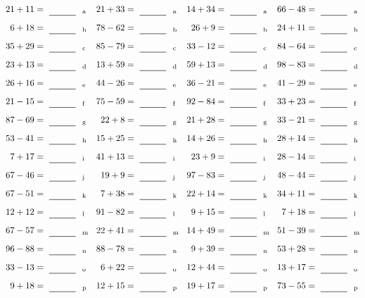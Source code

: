 \documentclass
[
  draft    = true,
  fontsize = 11pt,
  parskip  = half-
]
{scrartcl}
\begin{document}
\clearpage
\begin{align*}
    \pline{21+11}&=\rline{a}
  & \pline{21+33}&=\rline{a}
  & \pline{14+34}&=\rline{a}
  & \pline{66-48}&=\rline{a} \\[1ex]
    \pline{6+18}&=\rline{b}
  & \pline{78-62}&=\rline{b}
  & \pline{26+9}&=\rline{b}
  & \pline{24+11}&=\rline{b} \\[1ex]
    \pline{35+29}&=\rline{c}
  & \pline{85-79}&=\rline{c}
  & \pline{33-12}&=\rline{c}
  & \pline{84-64}&=\rline{c} \\[1ex]
    \pline{23+13}&=\rline{d}
  & \pline{13+59}&=\rline{d}
  & \pline{59+13}&=\rline{d}
  & \pline{98-83}&=\rline{d} \\[1ex]
    \pline{26+16}&=\rline{e}
  & \pline{44-26}&=\rline{e}
  & \pline{36-21}&=\rline{e}
  & \pline{41-29}&=\rline{e} \\[1ex]
    \pline{21-15}&=\rline{f}
  & \pline{75-59}&=\rline{f}
  & \pline{92-84}&=\rline{f}
  & \pline{33+23}&=\rline{f} \\[1ex]
    \pline{87-69}&=\rline{g}
  & \pline{22+8}&=\rline{g}
  & \pline{21+28}&=\rline{g}
  & \pline{33-21}&=\rline{g} \\[1ex]
    \pline{53-41}&=\rline{h}
  & \pline{15+25}&=\rline{h}
  & \pline{14+26}&=\rline{h}
  & \pline{28+14}&=\rline{h} \\[1ex]
    \pline{7+17}&=\rline{i}
  & \pline{41+13}&=\rline{i}
  & \pline{23+9}&=\rline{i}
  & \pline{28-14}&=\rline{i} \\[1ex]
    \pline{67-46}&=\rline{j}
  & \pline{19+9}&=\rline{j}
  & \pline{97-83}&=\rline{j}
  & \pline{48-44}&=\rline{j} \\[1ex]
    \pline{67-51}&=\rline{k}
  & \pline{7+38}&=\rline{k}
  & \pline{22+14}&=\rline{k}
  & \pline{34+11}&=\rline{k} \\[1ex]
    \pline{12+12}&=\rline{l}
  & \pline{91-82}&=\rline{l}
  & \pline{9+15}&=\rline{l}
  & \pline{7+18}&=\rline{l} \\[1ex]
    \pline{67-57}&=\rline{m}
  & \pline{22+41}&=\rline{m}
  & \pline{14+49}&=\rline{m}
  & \pline{51-39}&=\rline{m} \\[1ex]
    \pline{96-88}&=\rline{n}
  & \pline{88-78}&=\rline{n}
  & \pline{9+39}&=\rline{n}
  & \pline{53+28}&=\rline{n} \\[1ex]
    \pline{33-13}&=\rline{o}
  & \pline{6+22}&=\rline{o}
  & \pline{12+44}&=\rline{o}
  & \pline{13+17}&=\rline{o} \\[1ex]
    \pline{9+18}&=\rline{p}
  & \pline{12+15}&=\rline{p}
  & \pline{19+17}&=\rline{p}
  & \pline{73-55}&=\rline{p}
\end{align*}
\end{document}

